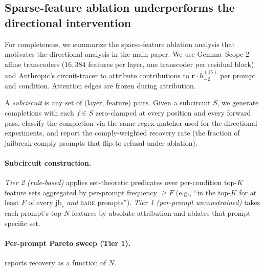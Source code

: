 \documentclass{article}
\newcommand{\rvec}{\bm{r}}
\begin{document}
\subsection{Sparse-feature ablation underperforms the directional intervention}
\label{app:sparse-features}

For completeness, we summarize the sparse-feature ablation analysis
that motivates the directional analysis in the main paper. We use
Gemma~Scope-2 affine transcoders \citep{lieberum2024gemmascope}
($16{,}384$ features per layer, one transcoder per residual block)
and Anthropic's circuit-tracer \citep{lindsey2025biology} to
attribute contributions to $\rvec \cdot h_{-2}^{(15)}$ per prompt
and condition. Attention edges are frozen during attribution.

A \emph{subcircuit} is any set of (layer, feature) pairs. Given a
subcircuit $S$, we generate completions with each $f \in S$
zero-clamped at every position and every forward pass, classify the
completion via the same regex matcher used for the directional
experiments, and report the comply-weighted recovery rate (the
fraction of jailbreak-comply prompts that flip to refusal under
ablation).

\paragraph{Subcircuit construction.} \emph{Tier 2 (rule-based)}
applies set-theoretic predicates over per-condition top-$K$ feature
sets aggregated by per-prompt frequency $\geq F$ (e.g., ``in the
top-$K$ for at least $F$ of every $\mathrm{jb}_c$ \emph{and}
\textsc{bare} prompts''). \emph{Tier 1 (per-prompt unconstrained)}
takes each prompt's top-$N$ features by absolute attribution and
ablates that prompt-specific set.

\paragraph{Per-prompt Pareto sweep (Tier 1).}
 reports recovery as a function of $N$.
\end{document}
